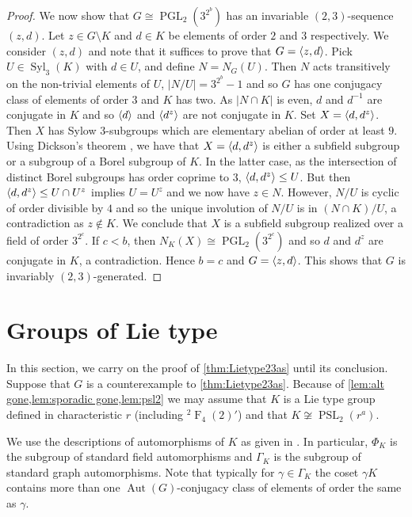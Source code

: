 \documentclass[12pt,a4paper]{amsart}
\DeclareMathOperator{\Aut}{Aut}
\DeclareMathOperator{\Syl}{Syl}
\DeclareMathOperator{\F}{F}
\DeclareMathOperator{\PGL}{PGL}
\DeclareMathOperator{\PSL}{PSL}
\DeclarePairedDelimiter{\gen}{\langle}{\rangle}
\begin{document}
\begin{proof}
We now show that $G\cong \PGL_2(3^{2^b})$ has an invariable $(2,3)$-sequence $(z,d)$.  Let $z \in G\setminus K$ and $d \in K$ be elements of order $2$ and $3$ respectively.  We consider $(z,d)$ and note that it suffices to prove that $G=\gen{z,d}$. Pick $U \in \Syl_3(K)$ with $d \in U$, and define $N= N_G(U)$. Then $N$ acts transitively on the non-trivial elements of $U$, $|N/U|=3^{2^b}-1$ and so $G$ has one conjugacy class of elements of order $3$ and $K$ has two.
As $|N\cap K| $ is even, $d$ and $d^{-1}$ are conjugate in $K$ and so
 $\gen{d}$ and $\gen{d^z}$ are not conjugate in $K$.  Set $X= \gen{d, d^z}$. Then $X$ has Sylow $3$-subgroups which are elementary abelian of order at least $9$. Using Dickson's theorem \cite[Theorem 6.5.1]{GLS3}, we have that $X=\gen{d,d^z}$ is either a subfield subgroup or a subgroup of a Borel subgroup   of $K$. In the latter case, as the intersection of distinct Borel subgroups has order coprime to $3$, $\gen{d,d^z} \le U$. But then $\gen{d,d^z} \le U \cap U^z$ implies $U=U^z$ and  we now have   $z \in N$. However, $N/U$ is cyclic of order divisible  by $4$ and so the unique involution of $N/U$ is in $(N\cap K)/U$, a contradiction as $z \not \in K$.
We conclude that  $X$ is a subfield subgroup realized over a field of order $3^{2^c}$. If $c< b$, then $N_K(X) \cong \PGL_2(3^{2^c})$ and so $d$ and $d^z$ are conjugate in $K$, a contradiction. Hence $b=c$ and $G=\gen{z,d}$. This shows that $G$ is invariably $(2,3)$-generated.
\end{proof}






 \section{ Groups of Lie type}\label{sec:7}


 In this section, we carry on  the proof of \cref{thm:Lietype23as} until its conclusion. Suppose that $G$ is a counterexample to  \cref{thm:Lietype23as}. Because of \cref{lem:alt gone,lem:sporadic gone,lem:psl2} we may assume that $K$ is a Lie type group defined in characteristic $r$ (including ${}^2\F_4(2)'$) and that $K \not \cong \PSL_2(r^a)$.

We use the descriptions of automorphisms of $K$ as given  in \cite[Section 2.5]{GLS3}. In particular, $\Phi_K$ is the subgroup of standard field automorphisms and $\Gamma_K$ is the subgroup of standard graph automorphisms. Note that typically for $\gamma \in \Gamma_K$ the coset $\gamma K$ contains more than one $\Aut(G)$-conjugacy class of elements of order the same as $\gamma$.
\end{document}
